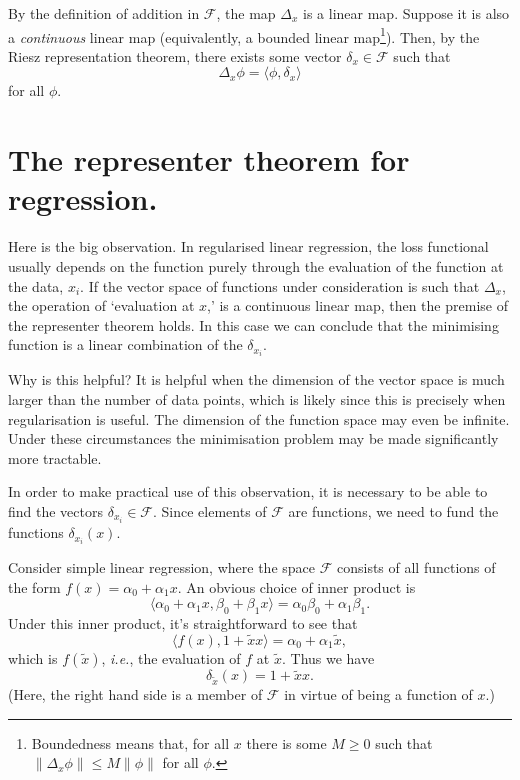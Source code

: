 \documentclass[11pt]{article}
\begin{document}
By the definition of addition in \(\mathcal{F}\), the map \(\Delta_x\) is a linear
map. Suppose it is also a \emph{continuous} linear map (equivalently, a bounded
linear map\footnote{Boundedness means that, for all \(x\) there is some \(M\geq 0\) such
that \(\lVert \Delta_x \phi\rVert \leq M \lVert \phi\rVert\) for all \(\phi\).}). Then, by the Riesz representation theorem, there exists some
vector \(\delta_x \in\mathcal{F}\) such that
\begin{equation}
\Delta_{x} \phi = \langle \phi, \delta_{x}\rangle
\end{equation}
for all \(\phi\).



\section{The representer theorem for regression.}
\label{sec:org667e43a}

Here is the big observation. In regularised linear regression, the loss
functional usually depends on the function purely through the evaluation of the
function at the data, \(x_i\). If the vector space of functions under
consideration is such that \(\Delta_x\), the operation of `evaluation at \(x\),' is
a continuous linear map, then the premise of the representer theorem holds. In
this case we can conclude that the minimising function is a linear combination
of the \(\delta_{x_i}\).

Why is this helpful? It is helpful when the dimension of the vector space is
much larger than the number of data points, which is likely since this is
precisely when regularisation is useful. The dimension of the function space may
even be infinite. Under these circumstances the minimisation problem may be made
significantly more tractable.

In order to make practical use of this observation, it is necessary to be able
to find the vectors \(\delta_{x_i}\in\mathcal{F}\). Since elements of
\(\mathcal{F}\) are functions, we need to fund the functions \(\delta_{x_i}(x)\).

Consider simple linear regression, where the space \(\mathcal{F}\) consists of all
functions of the form \(f(x) = \alpha_0 + \alpha_1 x\). An obvious choice of
inner product is
\begin{equation*}
\langle \alpha_0 + \alpha_1 x, \beta_0 + \beta_1 x\rangle =
\alpha_0\beta_0 + \alpha_1\beta_1.
\end{equation*} 
Under this inner product, it's straightforward to see that
\begin{equation*}
\langle f(x), 1 + \tilde{x}x\rangle = \alpha_0 + \alpha_1 \tilde{x}, 
\end{equation*}
which is \(f(\tilde{x})\), \emph{i.e.}, the evaluation of \(f\) at \(\tilde{x}\). Thus we have
\begin{equation*}
\delta_{\tilde{x}}(x) = 1 + \tilde{x}x.
\end{equation*}
(Here, the right hand side is a member of \(\mathcal{F}\) in virtue of being a
function of \(x\).)
\end{document}

